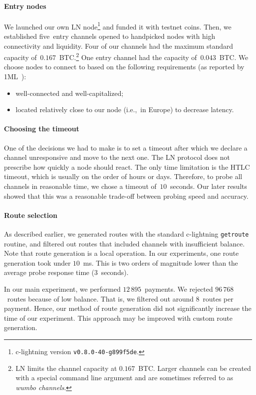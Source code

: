 \paragraph{Entry nodes}
We launched our own LN node\footnote{c-lightning version \texttt{v0.8.0-40-g899f5de}.} and funded it with testnet coins.
Then, we established five~entry channels opened to handpicked nodes with high connectivity and liquidity.
Four of our channels had the maximum standard capacity of~$0.167$~BTC\@.\footnote{LN limits the channel capacity at $0.167$~BTC\@. Larger channels can be created with a special command line argument and are sometimes referred to as \textit{wumbo channels}.}
One entry channel had the capacity of~$0.043$~BTC\@.
We choose nodes to connect to based on the following requirements (as reported by 1ML~\cite{1MLTopConnected}):
\begin{itemize}
	\item well-connected and well-capitalized;
	\item located relatively close to our node (i.e.,~in Europe) to decrease latency.
\end{itemize}

\paragraph{Choosing the timeout}
One of the decisions we had to make is to set a timeout after which we declare a channel unresponsive and move to the next one.
The LN protocol does not prescribe how quickly a node should react.
The only time limitation is the HTLC timeout, which is usually on the order of hours or days.
Therefore, to probe all channels in reasonable time, we chose a timeout of~$10$~seconds.
Our later results showed that this was a reasonable trade-off between probing speed and accuracy.

\paragraph{Route selection}
As described earlier, we generated routes with the standard c-lightning \texttt{getroute} routine, and filtered out routes that included channels with insufficient balance.
Note that route generation is a local operation.
In our experiments, one route generation took under $10$~ms.
This is two orders of magnitude lower than the average probe response time ($3$~seconds).

In our main experiment, we performed $12\,895$~payments.
We rejected $96\,768$~routes because of low balance.
That is, we filtered out around $8$~routes per payment.
Hence, our method of route generation did not significantly increase the time of our experiment.
This approach may be improved with custom route generation.

